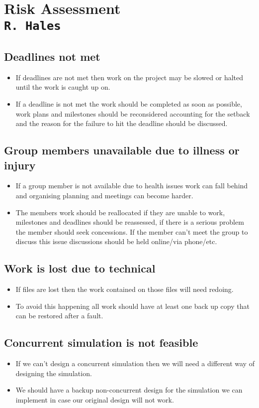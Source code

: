 \pagestyle{empty}

\section{Risk Assessment\\{\small\tt R.~Hales}}
\subsection{Deadlines not met}
\begin{itemize}
\item If deadlines are not met then work on the project may be slowed or halted  until the work is caught up on.
\item If a deadline is not met the work should be completed as soon as possible, work plans and milestones should be reconsidered accounting for the setback and the reason for the failure to hit the deadline should be discussed.
\end{itemize}
\subsection{Group members unavailable due to illness or injury}
\begin{itemize}
\item If a group member is not available due to health issues work can fall behind and organising planning and meetings can become harder.
\item The members work should be reallocated if they are unable to work, milestones and deadlines should be reassessed, if there is a serious problem the member should seek concessions. If the member can't meet the group to discuss this issue discussions should be held online/via phone/etc.
\end{itemize}
\subsection{Work is lost due to technical}
\begin{itemize}
\item If files are lost then the work contained on those files will need redoing.
\item To avoid this happening all work should have at least one back up copy that can be restored after a fault.
\end{itemize}
\subsection{Concurrent simulation is not feasible}
\begin{itemize}
\item If we can't design a concurrent simulation then we will need a different way of designing the simulation.
\item We should have a backup non-concurrent design for the simulation we can implement in case our original design will not work.
\end{itemize}
\clearpage
\endinput
